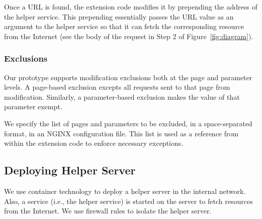 Once a URL is found, the extension code modifies it by prepending the address of the helper service. This prepending essentially passes the URL value as an argument to the helper service so that it can fetch the corresponding resource from the Internet (see the body of the request in Step 2 of Figure~\ref{fig:diagram}). %

%
%
%	


\subsubsection{Exclusions}
Our prototype supports modification exclusions both at the page and parameter levels. A page-based exclusion excepts all requests sent to that page from modification. Similarly, a parameter-based exclusion makes the value of that parameter exempt. 

We specify the list of pages and parameters to be excluded, in a space-separated format, in an NGINX configuration file. This list is used as a reference from within the extension code to enforce necessary exceptions. 

\subsection{Deploying Helper Server}
We use container technology to deploy a helper server in the internal network. Also, a service (i.e., the helper service) is started on the server to fetch resources from the Internet. We use firewall rules to isolate the helper server.


